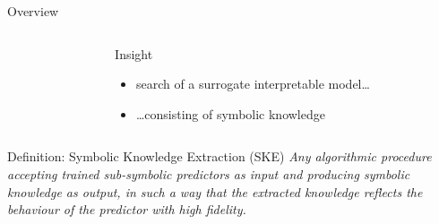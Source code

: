 \documentclass[presentation]{beamer}\mode<presentation>{\usetheme{AMSBolognaFC}}
\begin{document}
\begin{frame}[allowframebreaks]{Overview}
\begin{columns}
\begin{column}{0.19\linewidth}
        \end{column}
        \hfill
        \begin{column}{0.8\linewidth}
            \begin{block}{Insight}
                \begin{itemize}
                    \item search of a \alert{surrogate} interpretable model\ldots
                    \medskip
                    \item \ldots consisting of \alert{symbolic knowledge}
                \end{itemize}
            \end{block}
        \end{column}
    \end{columns}

    \framebreak

    \begin{block}{Definition: Symbolic Knowledge Extraction (SKE)}\centering\itshape
        Any \emph{algorithmic} procedure accepting \emph{trained} sub-symbolic predictors as input and producing \emph{symbolic} knowledge as output, in such a way that the extracted knowledge reflects the behaviour of the predictor with high \emph{fidelity}.
    \end{block}

    \framebreak


\end{frame}
\end{document}
